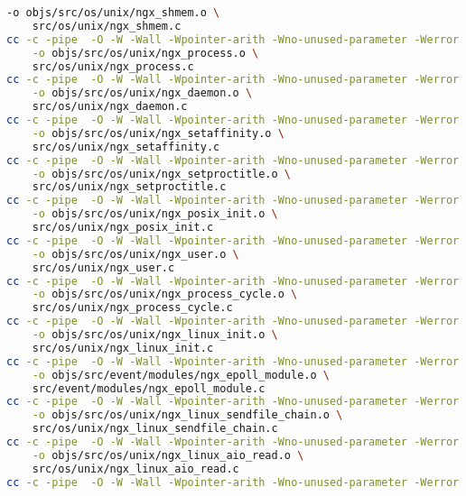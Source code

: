 \begin{lstlisting}[language=bash]
	-o objs/src/os/unix/ngx_shmem.o \
	src/os/unix/ngx_shmem.c
cc -c -pipe  -O -W -Wall -Wpointer-arith -Wno-unused-parameter -Werror -g  -I src/core -I src/event -I src/event/modules -I src/os/unix -I objs \
	-o objs/src/os/unix/ngx_process.o \
	src/os/unix/ngx_process.c
cc -c -pipe  -O -W -Wall -Wpointer-arith -Wno-unused-parameter -Werror -g  -I src/core -I src/event -I src/event/modules -I src/os/unix -I objs \
	-o objs/src/os/unix/ngx_daemon.o \
	src/os/unix/ngx_daemon.c
cc -c -pipe  -O -W -Wall -Wpointer-arith -Wno-unused-parameter -Werror -g  -I src/core -I src/event -I src/event/modules -I src/os/unix -I objs \
	-o objs/src/os/unix/ngx_setaffinity.o \
	src/os/unix/ngx_setaffinity.c
cc -c -pipe  -O -W -Wall -Wpointer-arith -Wno-unused-parameter -Werror -g  -I src/core -I src/event -I src/event/modules -I src/os/unix -I objs \
	-o objs/src/os/unix/ngx_setproctitle.o \
	src/os/unix/ngx_setproctitle.c
cc -c -pipe  -O -W -Wall -Wpointer-arith -Wno-unused-parameter -Werror -g  -I src/core -I src/event -I src/event/modules -I src/os/unix -I objs \
	-o objs/src/os/unix/ngx_posix_init.o \
	src/os/unix/ngx_posix_init.c
cc -c -pipe  -O -W -Wall -Wpointer-arith -Wno-unused-parameter -Werror -g  -I src/core -I src/event -I src/event/modules -I src/os/unix -I objs \
	-o objs/src/os/unix/ngx_user.o \
	src/os/unix/ngx_user.c
cc -c -pipe  -O -W -Wall -Wpointer-arith -Wno-unused-parameter -Werror -g  -I src/core -I src/event -I src/event/modules -I src/os/unix -I objs \
	-o objs/src/os/unix/ngx_process_cycle.o \
	src/os/unix/ngx_process_cycle.c
cc -c -pipe  -O -W -Wall -Wpointer-arith -Wno-unused-parameter -Werror -g  -I src/core -I src/event -I src/event/modules -I src/os/unix -I objs \
	-o objs/src/os/unix/ngx_linux_init.o \
	src/os/unix/ngx_linux_init.c
cc -c -pipe  -O -W -Wall -Wpointer-arith -Wno-unused-parameter -Werror -g  -I src/core -I src/event -I src/event/modules -I src/os/unix -I objs \
	-o objs/src/event/modules/ngx_epoll_module.o \
	src/event/modules/ngx_epoll_module.c
cc -c -pipe  -O -W -Wall -Wpointer-arith -Wno-unused-parameter -Werror -g  -I src/core -I src/event -I src/event/modules -I src/os/unix -I objs \
	-o objs/src/os/unix/ngx_linux_sendfile_chain.o \
	src/os/unix/ngx_linux_sendfile_chain.c
cc -c -pipe  -O -W -Wall -Wpointer-arith -Wno-unused-parameter -Werror -g  -I src/core -I src/event -I src/event/modules -I src/os/unix -I objs \
	-o objs/src/os/unix/ngx_linux_aio_read.o \
	src/os/unix/ngx_linux_aio_read.c
cc -c -pipe  -O -W -Wall -Wpointer-arith -Wno-unused-parameter -Werror -g  -I src/core -I src/event -I src/event/modules -I src/os/unix -I objs \

\end{lstlisting}
